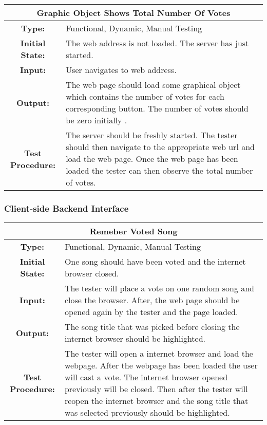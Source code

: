 \documentclass[12pt, titlepage]{article}
\begin{document}
\begin{center}
\begin{table}[H]
\begin{tabularx}{\textwidth}{| c X |}
\hline
\multicolumn{2}{|c|}{\textbf{Graphic Object Shows Total Number Of Votes}}\\
\hline
\textbf{Type: } & Functional, Dynamic, Manual Testing\\

\textbf{Initial State: } & The web address is not loaded. The server has just started.\\

\textbf{Input: } & User navigates to web address.\\

\textbf{Output: } & The web page should load some graphical object which contains the number of votes for each corresponding button. The number of votes should be zero initially .\\

\textbf{Test Procedure:  } & The server should be freshly started. The tester should then navigate to the appropriate web url and load the web page. Once the web page has been loaded the tester can then observe the total number of votes.\\
\hline
\end{tabularx}
\end{table}
\end{center}

\subsubsection{Client-side Backend Interface}

\begin{center}
\begin{table}[H]
\begin{tabularx}{\textwidth}{| c X |}
\hline
\multicolumn{2}{|c|}{\textbf{Remeber Voted Song}}\\
\hline
\textbf{Type: } & Functional, Dynamic, Manual Testing\\

\textbf{Initial State: } & One song should have been voted and the internet browser closed.\\

\textbf{Input: } & The tester will place a vote on one random song and close the browser. After, the web page should be opened again by the tester and the page loaded.\\

\textbf{Output: } & The song title that was picked before closing the internet browser should be highlighted.\\

\textbf{Test Procedure: } & The tester will open a internet browser and load the webpage. After the webpage has been loaded the user will cast a vote. The internet browser opened previously will be closed. Then after the tester will reopen the internet browser and the song title that was selected previously should be highlighted.\\
\hline
\end{tabularx}
\end{table}
\end{center}
\end{document}
